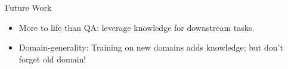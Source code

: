 \begin{frame}{Future Work}
\begin{center}
\textbf{}
\end{center}
\vspace{2ex}

\begin{itemize}
\item More to life than QA: leverage knowledge for downstream tasks.
\pause
\vspace{2ex}
\item Domain-generality: Training on new domains adds knowledge; but don't
      forget old domain!
\end{itemize}
\vspace{2ex}
\pause

\begin{center}
\end{center}
\end{frame}



